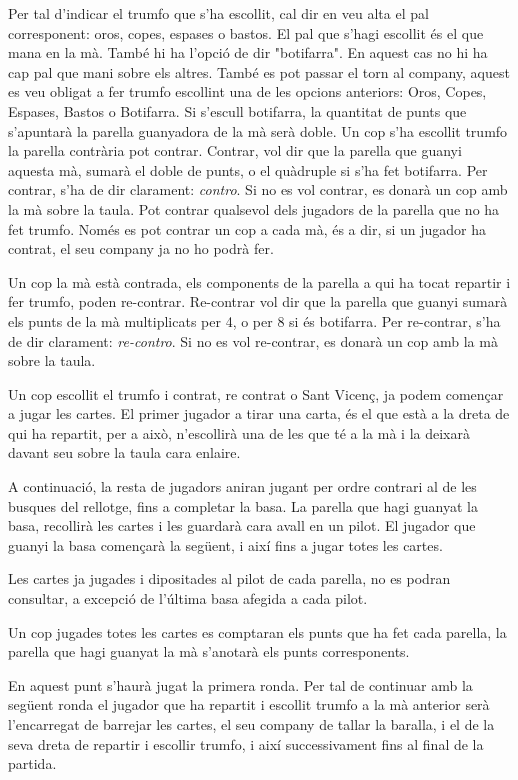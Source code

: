Per tal d'indicar el trumfo que s'ha escollit, cal dir en veu alta el pal corresponent: oros, copes, espases o bastos. El pal que s'hagi escollit és el que mana en la mà. També hi ha l'opció de dir "botifarra". En aquest cas no hi ha cap pal que mani sobre els altres. També es pot passar el torn al company, aquest es veu obligat a fer trumfo escollint una de les opcions anteriors: Oros, Copes, Espases, Bastos o Botifarra. Si s'escull botifarra, la quantitat de punts que s'apuntarà la parella guanyadora de la mà serà doble.
\label{sec:contros}
Un cop s'ha escollit trumfo la parella contrària pot contrar. Contrar, vol dir que la parella que guanyi aquesta mà, sumarà el doble de punts, o el quàdruple si s'ha fet botifarra. Per contrar, s'ha de dir clarament: \emph{contro}. Si no es vol contrar, es donarà un cop amb la mà sobre la taula. Pot contrar qualsevol dels jugadors de la parella que no ha fet trumfo. Només es pot contrar un cop a cada mà, és a dir, si un jugador ha contrat, el seu company ja no ho podrà fer.

Un cop la mà està contrada, els components de la parella a qui ha tocat repartir i fer trumfo, poden re-contrar. Re-contrar vol dir que la parella que guanyi sumarà els punts de la mà multiplicats per 4, o per 8 si és botifarra. Per re-contrar, s'ha de dir clarament: \emph{re-contro}. Si no es vol re-contrar, es donarà un cop amb la mà sobre la taula.


Un cop escollit el trumfo i contrat, re contrat o Sant Vicenç, ja podem començar a jugar les cartes. El primer jugador a tirar una carta, és el que està a la dreta de qui ha repartit, per a això, n'escollirà una de les que té a la mà i la deixarà davant seu sobre la taula cara enlaire.

A continuació, la resta de jugadors aniran jugant per ordre contrari al de les busques del rellotge, fins a completar la basa. La parella que hagi guanyat la basa, recollirà les cartes i les guardarà cara avall en un pilot. El jugador que guanyi la basa començarà la següent, i així fins a jugar totes les cartes.

Les cartes ja jugades i dipositades al pilot de cada parella, no es podran consultar, a excepció de l'última basa afegida a cada pilot.

Un cop jugades totes les cartes es comptaran els punts que ha fet cada parella, la parella que hagi guanyat la mà s'anotarà els punts corresponents.

En aquest punt s'haurà jugat la primera ronda. Per tal de continuar amb la següent ronda el jugador que ha repartit i escollit trumfo a la mà anterior serà l'encarregat de barrejar les cartes, el seu company de tallar la baralla, i el de la seva dreta de repartir i escollir trumfo, i així successivament fins al final de la partida.

